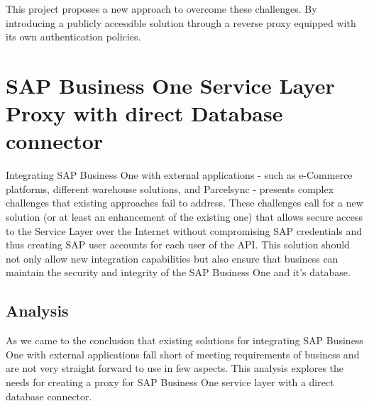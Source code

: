 This project proposes a new approach to overcome these challenges.
By introducing a publicly accessible solution through a reverse proxy equipped with its own authentication policies.

\section{SAP Business One Service Layer Proxy with direct Database connector}
\label{sec:sap-b1-service-layer-proxy}
Integrating SAP Business One with external applications - such as e-Commerce platforms, different warehouse solutions, and Parcelsync - presents complex challenges that existing  approaches fail to address. 
These challenges call for a new solution (or at least an enhancement of the existing one) that allows secure access to the Service Layer over the Internet without compromising SAP credentials and thus creating SAP user accounts for each user of the API.
This solution should not only allow new integration capabilities but also ensure that business can maintain the security and integrity of the SAP Business One and it's database.

\subsection{Analysis}
\label{subsec:analysis}
As we came to the conclusion that existing solutions for integrating SAP Business One with external applications fall short of meeting requirements of business and are not very straight forward to use in few aspects.
This analysis explores the needs for creating a proxy for SAP Business One service layer with a direct database connector.

